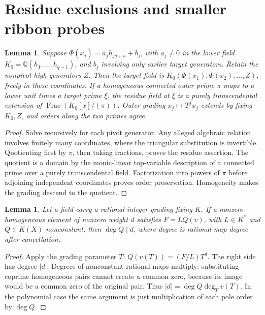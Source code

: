 \documentclass[11pt,a4paper]{amsart}
\numberwithin{equation}{section}
\theoremstyle{plain}
\newtheorem{lemma}[theorem]{Lemma}
\theoremstyle{definition}
\begin{document}
\section{Residue exclusions and smaller ribbon probes}\label{sec:older-cells}
\begin{lemma}\label{lem:triangular-residue}
Suppose \(\Phi(x_j)=a_jh_{jq+u}+b_j\), with \(a_j\ne0\) in the lower field \(K_0=\mathbb Q(h_1,\ldots,h_{q-1})\), and \(b_j\) involving only earlier target generators.  Retain the nonpivot high generators \(Z\).  Then the target field is \(K_0(\Phi(x_1),\Phi(x_2),\ldots,Z)\), freely in these coordinates.  If a homogeneous connected outer prime \(\pi\) maps to a lower unit times a target prime \(\xi\), the residue field at \(\xi\) is a purely transcendental extension of \(\operatorname{Frac}(K_0[x]/(\pi))\).  Outer grading \(x_j\mapsto T^jx_j\) extends by fixing \(K_0,Z\), and orders along the two primes agree.
\end{lemma}
\begin{proof}
Solve recursively for each pivot generator.  Any alleged algebraic relation involves finitely many coordinates, where the triangular substitution is invertible.  Quotienting first by \(\pi\), then taking fractions, proves the residue assertion.  The quotient is a domain by the monic-linear top-variable description of a connected prime over a purely transcendental field.  Factorization into powers of \(\pi\) before adjoining independent coordinates proves order preservation.  Homogeneity makes the grading descend to the quotient.
\end{proof}

\begin{lemma}\label{lem:graded-degree}
Let a field carry a rational integer grading fixing \(K\).  If a nonzero homogeneous element of nonzero weight \(d\) satisfies \(F=LQ(v)\), with \(L\in K^*\) and \(Q\in K(X)\) nonconstant, then \(\deg Q\mid d\), where degree is rational-map degree after cancellation.
\end{lemma}
\begin{proof}
Apply the grading parameter \(T\): \(Q(v(T))=(F/L)T^d\).  The right side has degree \(|d|\).  Degrees of nonconstant rational maps multiply: substituting coprime homogeneous pairs cannot create a common zero, because its image would be a common zero of the original pair.  Thus \(|d|=\deg Q\deg_Tv(T)\).  In the polynomial case the same argument is just multiplication of each pole order by \(\deg Q\).
\end{proof}
\end{document}
